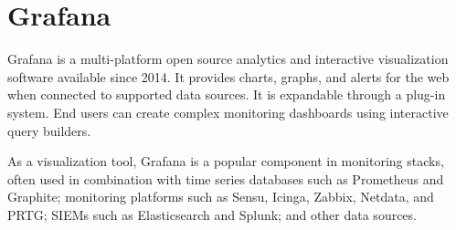 
\chapter{Grafana} %

\label{AppendixB} %


Grafana is a multi-platform open source analytics and interactive visualization software available since 2014. It provides charts, graphs, and alerts for the web when connected to supported data sources. It is expandable through a plug-in system. End users can create complex monitoring dashboards using interactive query builders.

As a visualization tool, Grafana is a popular component in monitoring stacks, often used in combination with time series databases such as Prometheus and Graphite; monitoring platforms such as Sensu, Icinga, Zabbix, Netdata, and PRTG; SIEMs such as Elasticsearch and Splunk; and other data sources.

